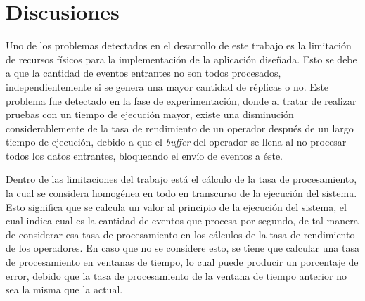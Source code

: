 \section{Discusiones}


\normalsize{Uno de los problemas detectados en el desarrollo de este trabajo es la limitación de recursos físicos para la implementación de la aplicación diseñada.} Esto se debe a que la cantidad de eventos entrantes no son todos procesados, independientemente si se genera una mayor cantidad de réplicas o no. Este problema fue detectado en la fase de experimentación, donde al tratar de realizar pruebas con un tiempo de ejecución mayor, existe una disminución considerablemente de la tasa de rendimiento de un operador después de un largo tiempo de ejecución, debido a que el \textit{buffer} del operador se llena al no procesar todos los datos entrantes, bloqueando el envío de eventos a éste.


Dentro de las limitaciones del trabajo está \normalsize{el cálculo de la tasa de procesamiento, la cual se considera homogénea en todo en transcurso de la ejecución del sistema. Esto significa que se calcula un valor al principio de la ejecución del sistema, el cual indica cual es la cantidad de eventos que procesa por segundo, de tal manera de considerar esa tasa de procesamiento en los cálculos de la tasa de rendimiento de los operadores. En caso que no se considere esto, se tiene que calcular una tasa de procesamiento en ventanas de tiempo, lo cual puede producir un porcentaje de error, debido que la tasa de procesamiento de la ventana de tiempo anterior no sea la misma que la actual.}

